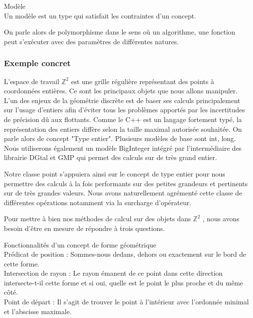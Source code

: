 \begin{Definition}{Modèle}\\
  Un modèle est un type qui satisfait les contraintes d'un concept.
\label{def:cpp-mod}

\end{Definition}

On parle alors de polymorphisme dans le sens où un algorithme, une fonction peut s'exécuter avec des paramètres de différentes natures.

\subsubsection{Exemple concret}

L'espace de travail $\mathbb{Z}^{2}$ est une grille régulière représentant des points à coordonnées entières. Ce sont les principaux objets que nous allons manipuler. L'un des enjeux de la géométrie discrète est de baser ses calculs principalement sur l'usage d'entiers afin d'éviter tous les problèmes apportés par les incertitudes de précision dû aux flottants. Comme le C++ est un langage fortement typé, la représentation des entiers diffère selon la taille maximal autorisée souhaitée. On parle alors de concept "Type entier". Plusieurs modèles de base sont int, long. Nous utiliserons également un modèle BigInteger intégré par l'intermédiaire des librairie DGtal et GMP qui permet des calculs sur de très grand entier.


Notre classe point s’appuiera ainsi sur le concept de type entier pour nous permettre des calculs à la fois performants sur des petites grandeurs et pertinents sur de très grandes valeurs. Nous avons naturellement agrémenté cette classe de différentes opérations notamment via la surcharge d'opérateur.


Pour mettre à bien nos méthodes de calcul sur des objets dans $\mathbb{Z}^{2}$ , nous avons besoin d'être en mesure de répondre à trois questions.

\begin{Definition}{ Fonctionnalités d'un concept de forme géométrique}\\
\label{def:cpp-fonc}
   Prédicat de position : Sommes-nous dedans, dehors ou exactement sur le bord de cette forme.\\
   Intersection de rayon : Le rayon émanent de ce point dans cette direction intersecte-t-il cette forme et si oui, quelle est le point le plus proche et du même côté.\\
   Point de départ : Il s'agit de trouver le point à l'intérieur avec l'ordonnée minimal et l'abscisse maximale. 
\end{Definition}

